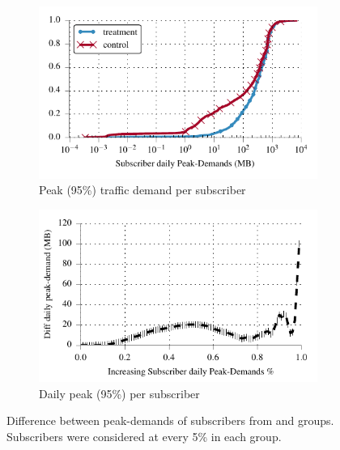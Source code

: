 \begin{figure}[t]
\begin{minipage}{1\linewidth}
\centering
%
\begin{subfigure}[b]{1\linewidth}
 \includegraphics[width=\linewidth]{figures/cdf_peak_demand-daily.pdf}
                \caption{Peak (95\%) traffic demand per subscriber\label{fig:CDF-data-rate-daily-perc95}}
 \end{subfigure}
% 
\begin{subfigure}[b]{.99\linewidth}
\includegraphics[width=\linewidth]{figures/diff_perc95_bytes_subsc-daily-overall_01.pdf}		%
                \caption{Daily peak (95\%) per subscriber\label{fig:diff-peak-daily}}
\end{subfigure}
%
\end{minipage}
  \caption{Difference between peak-demands of subscribers from \treatment{} and
  \control{} groups. Subscribers were considered at every 5\% in each group.
  \label{fig:traffic-demand-daily}}
\end{figure}


